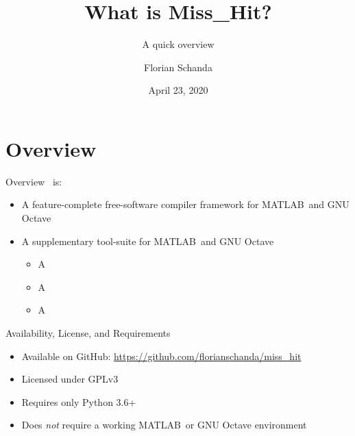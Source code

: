 \documentclass{beamer}
\author{Florian Schanda}
\title{What is {\sc Miss\_Hit}?}
\subtitle{A quick overview}
\date{April 23, 2020}
\newcommand{\mh}[0]{{\sc\structure{Miss\_Hit}}}
\begin{document}
\maketitle

{}

\section{Overview}
\begin{frame}{Overview}
  \mh~is:
  \begin{itemize}
  \item A feature-complete free-software compiler framework for
    MATLAB\texttrademark\ and GNU Octave
    \pause
  \item A supplementary tool-suite for MATLAB\texttrademark\ and GNU
    Octave
    \begin{itemize}
    \item A 
    \item A 
    \item A 
    \end{itemize}
  \end{itemize}
\end{frame}

\begin{frame}{Availability, License, and Requirements}
  \begin{itemize}
  \item Available on GitHub: \url{https://github.com/florianschanda/miss_hit}
  \item Licensed under GPLv3
    \pause
  \item Requires only Python 3.6+
  \item Does \emph{not} require a working MATLAB\texttrademark\ or GNU
    Octave environment
  \end{itemize}
\end{frame}
\end{document}
